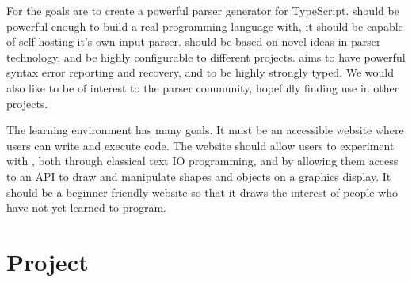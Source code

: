 For \tsPEG{} the goals are to create a powerful parser generator for TypeScript. \tsPEG{} should be powerful enough to build a real programming language with, it should be capable of self-hosting it's own input parser. \tsPEG{} should be based on novel ideas in parser technology, and be highly configurable to different projects. \tsPEG{} aims to have powerful syntax error reporting and recovery, and to be highly strongly typed. We would also like \tsPEG{} to be of interest to the parser community, hopefully finding use in other projects.

The learning environment has many goals. It must be an accessible website where users can write and execute \Setanta{} code. The website should allow users to experiment with \Setanta{}, both through classical text IO programming, and by allowing them access to an API to draw and manipulate shapes and objects on a graphics display. It should be a beginner friendly website so that it draws the interest of people who have not yet learned to program.

\section{Project}
